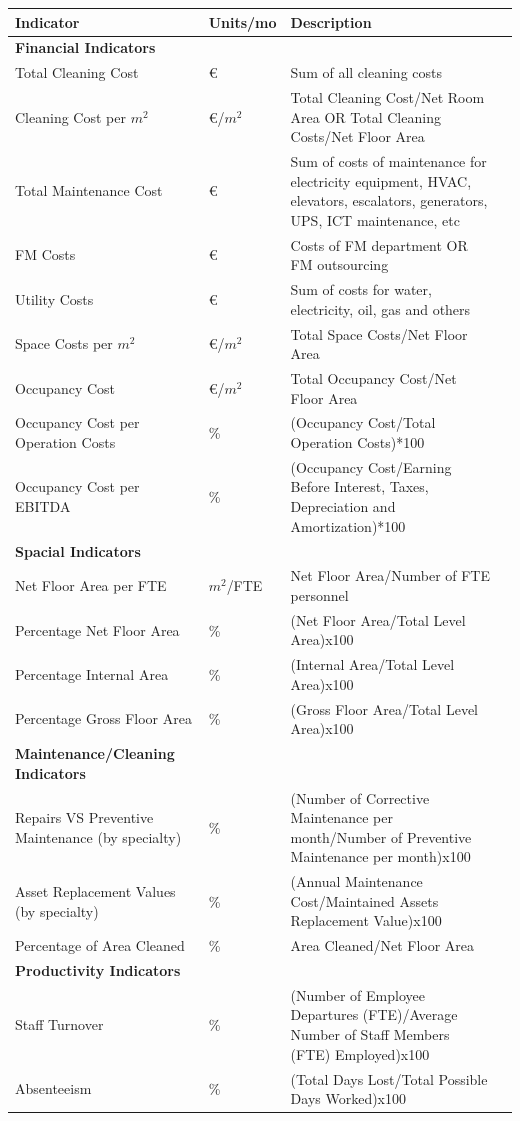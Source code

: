 \begin{table}[h!]%
	\vspace{0cm}
	\begin{adjustwidth}{-0.5cm}{0cm} 
	\resizebox{13cm}{!} {
	\begin{tabular}{llp{7cm}l}
		\hline
		 {\bf Indicator} &  {\bf Units/mo} & {\bf Description} \\
		\hline
		{\bf Financial Indicators} & & \\
		Total Cleaning Cost 				& \euro &  Sum of all cleaning costs \\
		Cleaning Cost per $m^2$ 			& \euro/$m^2$ &  Total Cleaning Cost/Net Room Area OR Total Cleaning Costs/Net Floor Area\\
		Total Maintenance Cost 				& \euro &  Sum of costs of maintenance for electricity equipment, HVAC, elevators, escalators, generators, UPS, ICT maintenance, etc\\  
		FM Costs 							& \euro &  Costs of FM department OR FM outsourcing \\
		Utility Costs 						& \euro  & Sum of costs for water, electricity, oil, gas and others \\
		Space Costs per $m^2$ 				& \euro/$m^2$ & Total Space Costs/Net Floor Area\\ 
		Occupancy Cost 						& \euro/$m^2$ & Total Occupancy Cost/Net Floor Area \\
		Occupancy Cost per Operation Costs & \% & (Occupancy Cost/Total Operation Costs)*100 \\
		Occupancy Cost per EBITDA & \% & (Occupancy Cost/Earning Before Interest, Taxes, Depreciation and Amortization)*100\\
		\hline

		{\bf Spacial Indicators} & & \\
		Net Floor Area per FTE				& $m^2$/FTE & Net Floor Area/Number of FTE personnel \\
		Percentage Net Floor Area 			& \% & (Net Floor Area/Total Level Area)x100 \\
		Percentage Internal Area			& \% & (Internal Area/Total Level Area)x100 \\
		Percentage Gross Floor Area 		& \% & (Gross Floor Area/Total Level Area)x100 \\
		\hline
		{\bf Maintenance/Cleaning Indicators} & &  \\
		Repairs VS Preventive Maintenance (by specialty)						& \% & (Number of Corrective Maintenance per month/Number of Preventive Maintenance per month)x100 \\
		Asset Replacement Values (by specialty)												& \% & (Annual Maintenance Cost/Maintained Assets Replacement Value)x100\\
		Percentage of Area Cleaned 												& \% & Area Cleaned/Net Floor Area \\
		\hline
		{\bf Productivity Indicators} & & \\
		Staff Turnover 	 			& \% & (Number of Employee Departures (FTE)/Average Number of Staff Members (FTE) Employed)x100\\
		Absenteeism  				& \% & (Total Days Lost/Total Possible Days Worked)x100 \\
		\hline


\end{tabular}}
\end{adjustwidth}
\end{table}
